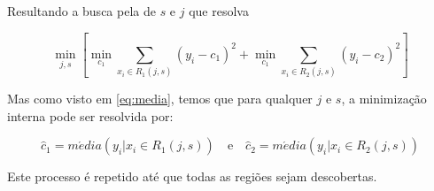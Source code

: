 Resultando a busca pela de \begin{math}s\end{math} e \begin{math}j\end{math} que resolva

\begin{equation}
\min_{j,s} \left [ \min_{c_{1}} \sum_{x_{i} \in R_{1} (j,s)} (y_{i} - c_{1})^{2} + \min_{c_{1}} \sum_{x_{i} \in R_{2} (j,s)}(y_{i} - c_{2})^{2} \right ]
\end{equation} 


Mas como visto em \ref{eq:media}, temos que para qualquer $j$ e $s$, a minimização interna pode ser resolvida por:

\begin{equation}
\hat c_{1} = m\acute edia(y_{i} | x_{i} \in R_{1}(j,s)) \quad \textrm{e} \quad \hat c_{2} = m\acute edia(y_{i} | x_{i} \in R_{2}(j,s))
\end{equation} 

Este processo é repetido até que todas as regiões sejam descobertas.
